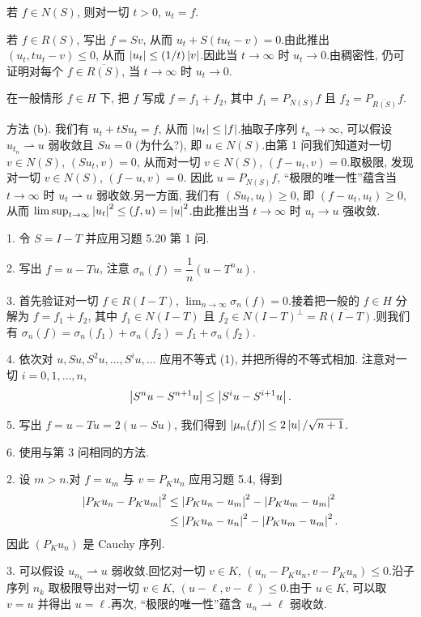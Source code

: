 若 $f\in N(S)$, 则对一切 $t>0$, $u_t=f$.

若 $f\in R(S)$, 写出 $f=Sv$, 从而 $u_t+S(tu_t-v)=0$.由此推出
$(u_t,tu_t-v)\le0$, 从而 $\left|u_t\right|\le(1/t)\left|v\right|$.因此当 $t\to\infty$
时 $u_t\to0$.由稠密性, 仍可证明对每个 $f\in\overline{R(S)}$, 当 $t\to\infty$
时 $u_t\to0$.

在一般情形 $f\in H$ 下, 把 $f$ 写成 $f=f_1+f_2$, 其中 $f_1=P_{N(S)}f$ 且
$f_2=P_{\overline{R(S)}}f$.

方法 (b). 我们有 $u_t+tSu_t=f$, 从而 $\left|u_t\right|\le\left|f\right|$.抽取子序列
$t_n\to\infty$, 可以假设 $u_{t_n}\rightharpoonup u$ 弱收敛且 $Su=0$ (为什么?),
即 $u\in N(S)$.由第 1 问我们知道对一切 $v\in N(S)$, $(Su_t,v)=0$, 从而对一切
$v\in N(S)$, $(f-u_t,v)=0$.取极限, 发现对一切 $v\in N(S)$, $(f-u,v)=0$.
因此 $u=P_{N(S)}f$, ``极限的唯一性''蕴含当 $t\to\infty$ 时 $u_t\rightharpoonup u$
弱收敛.另一方面, 我们有 $(Su_t,u_t)\ge0$, 即 $(f-u_t,u_t)\ge0$, 从而
$\limsup_{t\to\infty}\left|u_t\right|^2\le(f,u)=\left|u\right|^2$.由此推出当 $t\to\infty$
时 $u_t\to u$ 强收敛.


1. 令 $S=I-T$ 并应用习题 5.20 第 1 问.

2. 写出 $f=u-Tu$, 注意 $\sigma_n(f)=\dfrac1n(u-T^nu)$.

3. 首先验证对一切 $f\in R(I-T)$, $\lim_{n\to\infty}\sigma_n(f)=0$.接着把一般的
$f\in H$ 分解为 $f=f_1+f_2$, 其中 $f_1\in N(I-T)$ 且
$f_2\in N(I-T)^\perp=\overline{R(I-T)}$.则我们有
$\sigma_n(f)=\sigma_n(f_1)+\sigma_n(f_2)=f_1+\sigma_n(f_2)$.

4. 依次对 $u,Su,S^2u,\dots,S^iu,\dots$ 应用不等式 (1), 并把所得的不等式相加.
注意对一切 $i=0,1,\dots,n$,
\begin{equation*}
\left|S^nu-S^{n+1}u\right|\le\left|S^iu-S^{i+1}u\right|.
\end{equation*}

5. 写出 $f=u-Tu=2(u-Su)$, 我们得到 $\left|\mu_n(f)\right|\le2\left|u\right|/\sqrt{n+1}$.

6. 使用与第 3 问相同的方法.


2. 设 $m>n$.对 $f=u_m$ 与 $v=P_Ku_n$ 应用习题 5.4, 得到
\begin{align*}
\left|P_Ku_n-P_Ku_m\right|^2&\le\left|P_Ku_n-u_m\right|^2-\left|P_Ku_m-u_m\right|^2\\
&\le\left|P_Ku_n-u_n\right|^2-\left|P_Ku_m-u_m\right|^2.
\end{align*}
因此 $(P_Ku_n)$ 是 Cauchy 序列.

3. 可以假设 $u_{n_k}\rightharpoonup u$ 弱收敛.回忆对一切 $v\in K$,
$(u_n-P_Ku_n,v-P_Ku_n)\le0$.沿子序列 $n_k$ 取极限导出对一切 $v\in K$,
$(u-\ell,v-\ell)\le0$.由于 $u\in K$, 可以取 $v=u$ 并得出 $u=\ell$.再次,
``极限的唯一性''蕴含 $u_n\rightharpoonup\ell$ 弱收敛.

